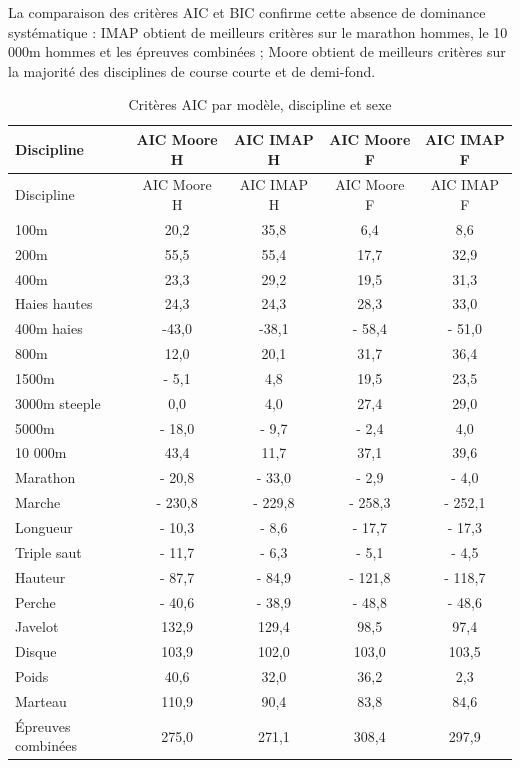 \documentclass[
  french,
  11pt,
  a4paper,
]{article}
\begin{document}
La comparaison des critères AIC et BIC confirme cette absence de
dominance systématique : IMAP obtient de meilleurs critères sur le
marathon hommes, le 10 000m hommes et les épreuves combinées ; Moore
obtient de meilleurs critères sur la majorité des disciplines de course
courte et de demi-fond.

\begin{longtable}[]{@{}lcccc@{}}
\caption{Critères AIC par modèle, discipline et
sexe}\label{tbl-comparatif-aic}\tabularnewline
\toprule\noalign{}
Discipline & AIC Moore H & AIC IMAP H & AIC Moore F & AIC IMAP F \\
\midrule\noalign{}
\endfirsthead
\toprule\noalign{}
Discipline & AIC Moore H & AIC IMAP H & AIC Moore F & AIC IMAP F \\
\midrule\noalign{}
\endhead
\bottomrule\noalign{}
\endlastfoot
100m & 20,2 & 35,8 & 6,4 & 8,6 \\
200m & 55,5 & 55,4 & 17,7 & 32,9 \\
400m & 23,3 & 29,2 & 19,5 & 31,3 \\
Haies hautes & 24,3 & 24,3 & 28,3 & 33,0 \\
400m haies & -43,0 & -38,1 & - 58,4 & - 51,0 \\
800m & 12,0 & 20,1 & 31,7 & 36,4 \\
1500m & - 5,1 & 4,8 & 19,5 & 23,5 \\
3000m steeple & 0,0 & 4,0 & 27,4 & 29,0 \\
5000m & - 18,0 & - 9,7 & - 2,4 & 4,0 \\
10 000m & 43,4 & 11,7 & 37,1 & 39,6 \\
Marathon & - 20,8 & - 33,0 & - 2,9 & - 4,0 \\
Marche & - 230,8 & - 229,8 & - 258,3 & - 252,1 \\
Longueur & - 10,3 & - 8,6 & - 17,7 & - 17,3 \\
Triple saut & - 11,7 & - 6,3 & - 5,1 & - 4,5 \\
Hauteur & - 87,7 & - 84,9 & - 121,8 & - 118,7 \\
Perche & - 40,6 & - 38,9 & - 48,8 & - 48,6 \\
Javelot & 132,9 & 129,4 & 98,5 & 97,4 \\
Disque & 103,9 & 102,0 & 103,0 & 103,5 \\
Poids & 40,6 & 32,0 & 36,2 & 2,3 \\
Marteau & 110,9 & 90,4 & 83,8 & 84,6 \\
Épreuves combinées & 275,0 & 271,1 & 308,4 & 297,9 \\
\end{longtable}
\end{document}
